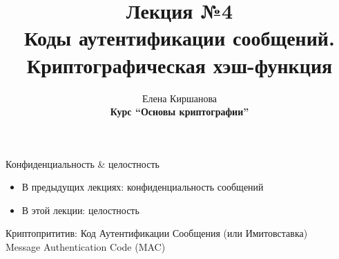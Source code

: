 \documentclass[usenames,dvipsnames,8pt,aspectratio=169]{beamer}
\title{Лекция №4 \\[10pt]
	Коды аутентификации сообщений. \\[5pt]
	Криптографическая хэш-функция}
\date{ Елена Киршанова \\  \textbf{Курс ``Основы криптографии''} \\  }
\begin{document}
	
\begin{frame}
	\titlepage
\end{frame}


\begin{frame}{Конфиденциальность \& целостность}
\LARGE 

\begin{itemize}
	\itemsep 1em
	\item В предыдущих лекциях: {\color{Orange} конфиденциальность} сообщений
	\item В этой лекции:  {\color{Orange} целостность}
\end{itemize}

\vspace{20pt}
\LARGE {\color{Orange}Криптопрититив}: Код Аутентификации Сообщения (или Имитовставка)  \\[5pt] 
Message Authentication Code (MAC) 


\end{frame}
\end{document}

